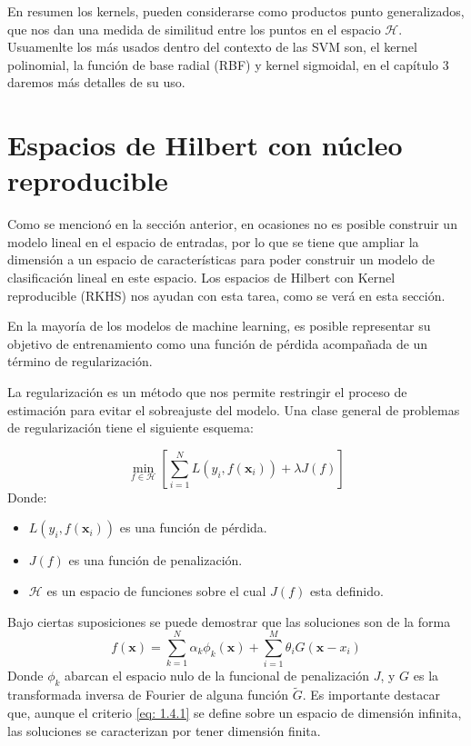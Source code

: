 \documentclass[letterpaper,12pt,oneside]{book}
\begin{document}
{{    En resumen los kernels, pueden considerarse como productos punto generalizados, que nos dan una medida de similitud entre los puntos en el espacio $\mathcal{H}$. Usuamenlte los más usados dentro del contexto de las SVM son, el kernel polinomial, la función de base radial (RBF) y kernel sigmoidal, en el capítulo 3 daremos más detalles de su uso.
}

\section{Espacios de Hilbert con núcleo reproducible}{
Como se mencionó en la sección anterior, en ocasiones no es posible construir un modelo lineal en el espacio de entradas, por lo que se tiene que ampliar la dimensión a un espacio de características para poder construir un modelo de clasificación lineal en este espacio. Los espacios de Hilbert con Kernel reproducible (RKHS) nos ayudan con esta tarea, como se verá en esta sección.

En la mayoría de los modelos de machine learning, es posible representar su objetivo de entrenamiento como una función de pérdida acompañada de un término de regularización.

La regularización es un método que nos permite restringir el proceso de estimación para evitar el sobreajuste del modelo. Una clase general de problemas de regularización tiene el siguiente esquema:
     
     \begin{equation}
         \min_{f \in \mathcal{H}} \left[ \sum_{i=1}^{N} L(y_i, f(\mathbf{x}_i)) + \lambda J(f) \right] \label{eq: 1.4.1}
     \end{equation}
     Donde:
     \begin{itemize}
        \item $L(y_i, f(\mathbf{x}_i))$ es una función de pérdida.
        \item $J(f)$ es una función de penalización. 
        \item $\mathcal{H}$ es un espacio de funciones sobre el cual $J(f)$ esta definido.
    \end{itemize}
      


      Bajo ciertas suposiciones se puede demostrar que las soluciones son de la forma  
      \begin{equation}
          f(\mathbf{x}) = \sum_{k=1}^{N} \alpha_k \phi_k(\mathbf{x}) + \sum_{i=1}^{M} \theta_i G(\mathbf{x} - x_i)
      \end{equation}
Donde \(\phi_k\) abarcan el espacio nulo de la funcional de penalización \(J\), y \(G\) es la transformada inversa de Fourier de alguna función \(\tilde{G}\). Es importante destacar que, aunque el criterio \eqref{eq: 1.4.1} se define sobre un espacio de dimensión infinita, las soluciones se caracterizan por tener dimensión finita.

}}
\end{document}
